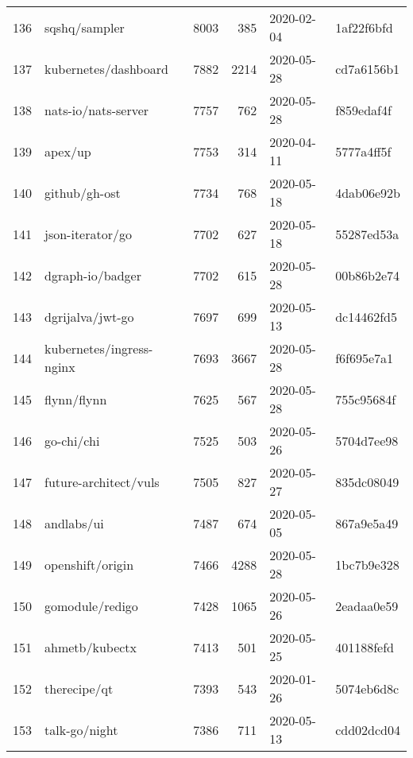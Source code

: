 \begin{longtable}{llrrll}
    136 &                                      sqshq/sampler &   8003 &    385 & 2020-02-04 &  1af22f6bfd \\
    137 &                               kubernetes/dashboard &   7882 &   2214 & 2020-05-28 &  cd7a6156b1 \\
    138 &                                nats-io/nats-server &   7757 &    762 & 2020-05-28 &  f859edaf4f \\
    139 &                                            apex/up &   7753 &    314 & 2020-04-11 &  5777a4ff5f \\
    140 &                                      github/gh-ost &   7734 &    768 & 2020-05-18 &  4dab06e92b \\
    141 &                                   json-iterator/go &   7702 &    627 & 2020-05-18 &  55287ed53a \\
    142 &                                   dgraph-io/badger &   7702 &    615 & 2020-05-28 &  00b86b2e74 \\
    143 &                                   dgrijalva/jwt-go &   7697 &    699 & 2020-05-13 &  dc14462fd5 \\
    144 &                           kubernetes/ingress-nginx &   7693 &   3667 & 2020-05-28 &  f6f695e7a1 \\
    145 &                                        flynn/flynn &   7625 &    567 & 2020-05-28 &  755c95684f \\
    146 &                                         go-chi/chi &   7525 &    503 & 2020-05-26 &  5704d7ee98 \\
    147 &                              future-architect/vuls &   7505 &    827 & 2020-05-27 &  835dc08049 \\
    148 &                                         andlabs/ui &   7487 &    674 & 2020-05-05 &  867a9e5a49 \\
    149 &                                   openshift/origin &   7466 &   4288 & 2020-05-28 &  1bc7b9e328 \\
    150 &                                    gomodule/redigo &   7428 &   1065 & 2020-05-26 &  2eadaa0e59 \\
    151 &                                     ahmetb/kubectx &   7413 &    501 & 2020-05-25 &  401188fefd \\
    152 &                                       therecipe/qt &   7393 &    543 & 2020-01-26 &  5074eb6d8c \\
    153 &                                      talk-go/night &   7386 &    711 & 2020-05-13 &  cdd02dcd04 \\

\end{longtable}
